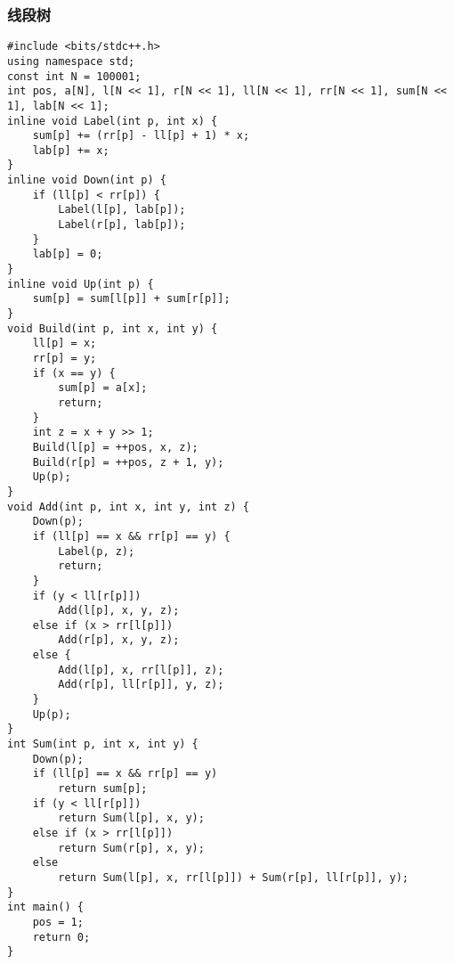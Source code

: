 ﻿\documentclass[a4paper]{article}
\begin{document}
\subsubsection{线段树}
\begin{lstlisting}
#include <bits/stdc++.h>
using namespace std;
const int N = 100001;
int pos, a[N], l[N << 1], r[N << 1], ll[N << 1], rr[N << 1], sum[N << 1], lab[N << 1];
inline void Label(int p, int x) {
    sum[p] += (rr[p] - ll[p] + 1) * x;
    lab[p] += x;
}
inline void Down(int p) {
    if (ll[p] < rr[p]) {
        Label(l[p], lab[p]);
        Label(r[p], lab[p]);
    }
    lab[p] = 0;
}
inline void Up(int p) {
    sum[p] = sum[l[p]] + sum[r[p]];
}
void Build(int p, int x, int y) {
    ll[p] = x;
    rr[p] = y;
    if (x == y) {
        sum[p] = a[x];
        return;
    }
    int z = x + y >> 1;
    Build(l[p] = ++pos, x, z);
    Build(r[p] = ++pos, z + 1, y);
    Up(p);
}
void Add(int p, int x, int y, int z) {
    Down(p);
    if (ll[p] == x && rr[p] == y) {
        Label(p, z);
        return;
    }
    if (y < ll[r[p]])
        Add(l[p], x, y, z);
    else if (x > rr[l[p]])
        Add(r[p], x, y, z);
    else {
        Add(l[p], x, rr[l[p]], z);
        Add(r[p], ll[r[p]], y, z);
    }
    Up(p);
}
int Sum(int p, int x, int y) {
    Down(p);
    if (ll[p] == x && rr[p] == y)
        return sum[p];
    if (y < ll[r[p]])
        return Sum(l[p], x, y);
    else if (x > rr[l[p]])
        return Sum(r[p], x, y);
    else
        return Sum(l[p], x, rr[l[p]]) + Sum(r[p], ll[r[p]], y);
}
int main() {
    pos = 1;
    return 0;
}
\end{lstlisting}
\end{document}
